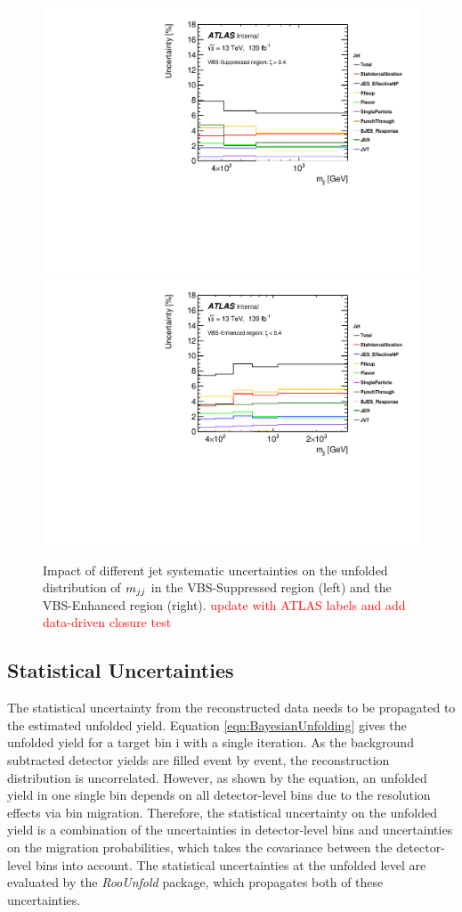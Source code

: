 \begin{figure}[!htb]
\centering
\includegraphics[width=.49\linewidth]{figures/Analysis/Systematics/jet_systematics_VBS_Suppressed.pdf}
\includegraphics[width=.49\linewidth]{figures/Analysis/Systematics/jet_systematics_VBS_Enhanced.pdf}
\caption{Impact of different jet systematic uncertainties on the unfolded distribution of $m_{jj}$ in the VBS-Suppressed region (left) and the VBS-Enhanced region (right). \textcolor{red}{update with ATLAS labels and add data-driven closure test}  \label{fig:jet_systematics_mjj}}
\end{figure}

\subsection{Statistical Uncertainties}
\label{subsubsec:StatUnc}
The statistical uncertainty from the reconstructed data needs to be propagated to the estimated unfolded yield. Equation \ref{eqn:BayesianUnfolding} gives the unfolded yield for a target bin i with a single iteration. As the background subtracted detector yields are filled event by event, the reconstruction distribution is uncorrelated. However, as shown by the equation, an unfolded yield in one single bin depends on all detector-level bins due to the resolution effects via bin migration. Therefore, the statistical uncertainty on the unfolded yield is a combination of the uncertainties in detector-level bins and uncertainties on the migration probabilities, which takes the covariance between the detector-level bins into account. The statistical uncertainties at the unfolded level are evaluated by the \textit{RooUnfold} package, which propagates both of these uncertainties.